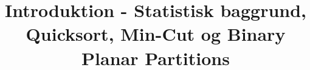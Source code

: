 
\title{Introduktion - Statistisk baggrund, Quicksort, Min-Cut og Binary Planar Partitions}


\maketitle
\tableofcontents
\newpage


\newpage


\newpage


\newpage


\newpage



